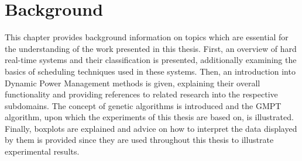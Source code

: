 
\chapter{Background}\label{chapter:background}
This chapter provides background information on topics which are essential for the understanding of the work presented in this thesis. First, an overview of hard real-time systems and their classification is presented, additionally examining the basics of scheduling techniques used in these systems. Then, an introduction into Dynamic Power Management methods is given, explaining their overall functionality and providing references to related research into the respective subdomains. The concept of genetic algorithms is introduced and the GMPT algorithm, upon which the experiments of this thesis are based on, is illustrated. Finally, boxplots are explained and advice on how to interpret the data displayed by them is provided since they are used throughout this thesis to illustrate experimental results.

